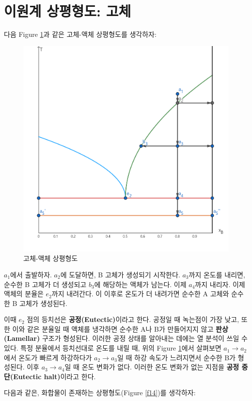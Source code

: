     \section{이원계 상평형도: 고체}
        \hspace{\parindent} 다음 Figure \ref{f13}과 같은 고체-액체 상평형도를 생각하자:\\
        \begin{figure}[H]
            \centering
            \includegraphics[width=0.7\linewidth]{Images/eutectic}
            \caption{고체-액체 상평형도}\label{f13}
        \end{figure}
        \par $a_1$에서 출발하자. $a_2$에 도달하면, B 고체가 생성되기 시작한다. $a_3$까지 온도를 내리면, 순수한 B 고체가 더 생성되고 $b_3$에 해당하는 액체가 남는다. 
        이제 $a_4$까지 내리자. 이제 액체의 분율은 $e_2$까지 내려간다. 이 이후로 온도가 더 내려가면 순수한 A 고체와 순수한 B 고체가 생성된다. 
        \par 이때 $e_2$ 점의 등치선은 \textbf{공정(Eutectic)}이라고 한다. 공정일 때 녹는점이 가장 낮고, 또한 이와 같은 분율일 때 액체를 냉각하면 순수한 A나 B가 만들어지지 
        않고 \textbf{판상(Lamellar)} 구조가 형성된다. 이러한 공정 상태를 알아내는 데에는 열 분석이 쓰일 수 있다. 특정 분율에서 등치선대로 온도를 내릴 때, 
        위의 Figure \ref{f13}에서 살펴보면 $a_1 \rightarrow a_2$에서 온도가 빠르게 하강하다가 $a_2 \rightarrow a_3$일 때 하강 속도가 느려지면서 순수한 B가 형성된다. 
        이후 $a_3 \rightarrow a_4$일 때 온도 변화가 없다. 이러한 온도 변화가 없는 지점을 \textbf{공정 중단(Eutectic halt)}이라고 한다.
        \par 다음과 같은, 화합물이 존재하는 상평형도(Figure \ref{f14})를 생각하자:\\
